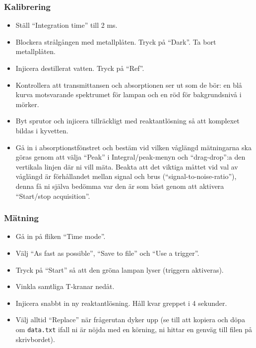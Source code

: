 \subsubsection{Kalibrering}
\begin{itemize}
\item Ställ ``Integration time'' till 2 ms.
\item Blockera strålgången med metallplåten. Tryck på ``Dark''. Ta bort
  metallplåten.
\item Injicera destillerat vatten. Tryck på ``Ref''.
\item Kontrollera att transmittansen och absorptionen ser ut som de
  bör: en blå kurva motsvarande spektrumet för lampan och en röd för
  bakgrundsnivå i mörker.
\item Byt sprutor och injicera tillräckligt med reaktantlösning så att
  komplexet bildas i kyvetten.
\item Gå in i absorptionstfönstret och bestäm vid vilken våglängd
  mätningarna ska göras genom att välja ``Peak'' i Integral/peak-menyn
  och ``drag-drop'':a den vertikala linjen där ni vill mäta. Beakta att det
  viktiga måttet vid val av våglängd är förhållandet mellan signal och brus
  (``signal-to-noise-ratio''), denna få ni själva bedömma var den är som
  bäst genom att aktivera ``Start/stop acquisition''.
\end{itemize}
\subsubsection{Mätning}
\begin{itemize}
\item Gå in på fliken ``Time mode''.
\item Välj ``As fast as possible'', ``Save to file'' och ``Use a trigger''.
\item Tryck på ``Start'' så att den gröna lampan lyser (triggern aktiveras).
\item Vinkla samtliga T-kranar nedåt.
\item Injicera snabbt in ny reaktantlösning. Håll kvar greppet i 4 sekunder.
\item Välj alltid ``Replace'' när frågerutan dyker upp (se till att
  kopiera och döpa om {\tt data.txt} ifall ni är nöjda med en körning, ni
  hittar en genväg till filen på skrivbordet).
\end{itemize}

